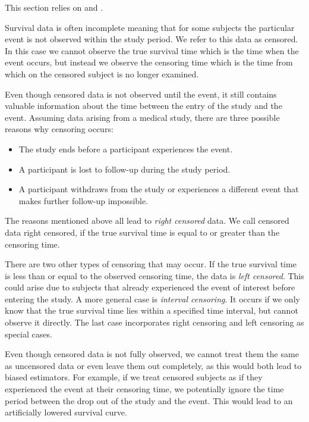 \documentclass[12pt, a4paper]{article}
\theoremstyle{definition}
\theoremstyle{plain}
\numberwithin{equation}{section}
\numberwithin{figure}{section}
\numberwithin{table}{section}
\begin{document}
	This section relies on \citet*{sabook} and \citet*{mathsabook}.
	
	Survival data is often incomplete meaning that for some subjects the particular event is not observed within the study period.
	We refer to this data as censored.
	In this case we cannot observe the true survival time which is the time when the event occurs, but instead we observe the censoring time which is the time from which on the censored subject is no longer examined.
	
	Even though censored data is not observed until the event, it still contains valuable information about the time between the entry of the study and the event.
	Assuming data arising from a medical study, there are three possible reasons why censoring occurs:
	\begin{itemize}
		\item The study ends before a participant experiences the event.
		\item A participant is lost to follow-up during the study period. %
		\item A participant withdraws from the study or experiences a different event that makes further follow-up impossible.
	\end{itemize}

	The reasons mentioned above all lead to \emph{right censored} data.
	We call censored data right censored, if the true survival time is equal to or greater than the censoring time.
	
	There are two other types of censoring that may occur.
	If the true survival time is less than or equal to the observed censoring time, the data is \emph{left censored}.
	This could arise due to subjects that already experienced the event of interest before entering the study.
	A more general case is \emph{interval censoring}. It occurs if we only know that the true survival time lies within a specified time interval, but cannot observe it directly.
	The last case incorporates right censoring and left censoring as special cases.
	
	Even though censored data is not fully observed, we cannot treat them the same as uncensored data or even leave them out completely, as this would both lead to biased estimators.
	For example, if we treat censored subjects as if they experienced the event at their censoring time, we potentially ignore the time period between the drop out of the study and the event.
	This would lead to an artificially lowered survival curve.
		
\end{document}

